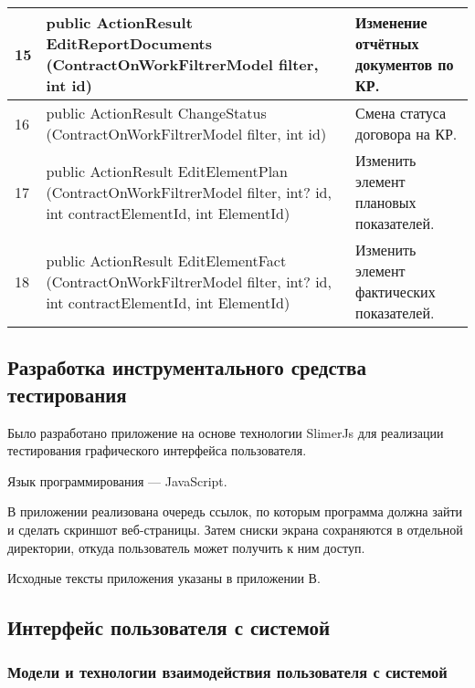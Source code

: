 \begin{footnotesize}
\begin{longtable}[h]{|p{}|p{}|p{}|}
	15 & public ActionResult EditReportDocuments (ContractOnWorkFiltrerModel filter, int id) & Изменение отчётных документов по КР. \\ \hline
	16 & public ActionResult ChangeStatus (ContractOnWorkFiltrerModel filter, int id) & Смена статуса договора на КР. \\ \hline
	17 & public ActionResult EditElementPlan (ContractOnWorkFiltrerModel filter, int? id, int contractElementId, int ElementId) & Изменить элемент плановых показателей. \\ \hline
	18 & public ActionResult EditElementFact (ContractOnWorkFiltrerModel filter, int? id, int contractElementId, int ElementId) & Изменить элемент фактических показателей. \\ \hline
\end{longtable}
\end{footnotesize}

\subsection{Разработка инструментального средства тестирования}

Было разработано приложение на основе технологии SlimerJs для реализации тестирования графического интерфейса пользователя.

Язык программирования --- JavaScript.

В приложении реализована очередь ссылок, по которым программа должна зайти и сделать скриншот веб-страницы.
Затем сниски экрана сохраняются в отдельной директории, откуда пользователь может получить к ним доступ.

Исходные тексты приложения указаны в приложении В.


\subsection{Интерфейс пользователя с системой}

\subsubsection{Модели и технологии взаимодействия пользователя с системой}

